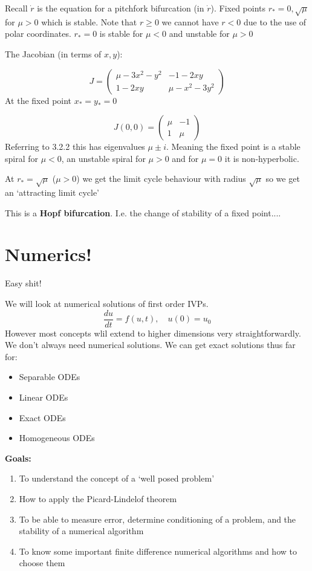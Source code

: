 \documentclass{/home/janmebows/Documents/LatexTemplates/myassignment}
\begin{document}
Recall $\dot r$ is the equation for a pitchfork bifurcation (in $\dot r$).
Fixed points $r_*=0,\sqrt{\mu}$ for $\mu > 0$ which is stable. Note that $r \geq0$ we cannot have $r<0$ due to the use of polar coordinates. 
$r_*=0$ is stable for $\mu <0$ and unstable for $\mu >0$


The Jacobian (in terms of $x,y$):

    
\[J = \begin{pmatrix}
    \mu -3x^2 - y^2 &-1 -2xy\\
    1-2xy & \mu - x^2 - 3y^2
\end{pmatrix}\]
At the fixed point $x_*=y_*=0$ 

\[J(0,0) = \begin{pmatrix}
    \mu&-1\\1&\mu
\end{pmatrix}\]
Referring to 3.2.2 this has eigenvalues $\mu\pm i$. Meaning the fixed point is a stable spiral for $\mu <0$, an unstable spiral for $\mu > 0$ and for $\mu =0$ it is non-hyperbolic.

At $r_* = \sqrt{\mu}$ ($\mu > 0$) we get the limit cycle behaviour with radius $\sqrt{\mu}$ so we get an `attracting limit cycle'

This is a \textbf{Hopf bifurcation}. I.e. the change of stability of a fixed point....







\section{Numerics!}
Easy shit!

We will look at numerical solutions of first order IVPs.
\[\frac{du}{dt} = f(u,t), \quad u(0) = u_0\]
However most concepts wlil extend to higher dimensions very straightforwardly.
We don't always need numerical solutions. We can get exact solutions thus far for:
\begin{itemize}
    \item Separable ODEs
    \item Linear ODEs
    \item Exact ODEs
    \item Homogeneous ODEs 
\end{itemize}

\textbf{Goals:}
\begin{enumerate}
    \item To understand the concept of a `well posed problem'
    \item How to apply the Picard-Lindelof theorem
    \item To be able to measure error, determine conditioning of a problem, and the stability of a numerical algorithm
    \item To know some important finite difference numerical algorithms and how to choose them 
\end{enumerate}
\end{document}
